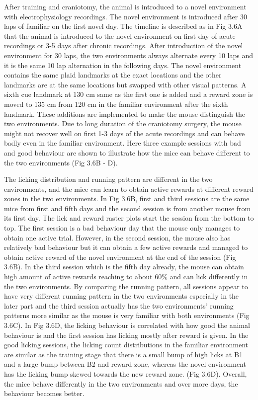 After training and craniotomy, the animal is introduced to a novel environment with electrophysiology recordings. The novel environment is introduced after 30 laps of familiar on the first novel day. The timeline is described as in Fig 3.6A that the animal is introduced to the novel environment on first day of acute recordings or 3-5 days after chronic recordings. After introduction of the novel environment for 30 laps, the two environments always alternate every 10 laps and it is the same 10 lap alternation in the following days. The novel environment contains the same plaid landmarks at the exact locations and the other landmarks are at the same locations but swapped with other visual patterns. A sixth cue landmark at 130 cm same as the first one is added and a reward zone is moved to 135 cm from 120 cm in the familiar environment after the sixth landmark. These additions are implemented to make the mouse distinguish the two environments. Due to long duration of the craniotomy surgery, the mouse might not recover well on first 1-3 days of the acute recordings and can behave badly even in the familiar environment. Here three example sessions with bad and good behaviour are shown to illustrate how the mice can behave different to the two environments (Fig 3.6B - D).

The licking distribution and running pattern are different in the two environments, and the mice can learn to obtain active rewards at different reward zones in the two environments. In Fig 3.6B, first and third sessions are the same mice from first and fifth days and the second session is from another mouse from its first day. The lick and reward raster plots start the session from the bottom to top. The first session is a bad behaviour day that the mouse only manages to obtain one active trial. However, in the second session, the mouse also has relatively bad behaviour but it can obtain a few active rewards and managed to obtain active reward of the novel environment at the end of the session (Fig 3.6B). In the third session which is the fifth day already, the mouse can obtain high amount of active rewards reaching to about 60\% and can lick differently in the two environments. By comparing the running pattern, all sessions appear to have very different running pattern in the two environments especially in the later part and the third session actually has the two environments' running patterns more similar as the mouse is very familiar with both environments (Fig 3.6C). In Fig 3.6D, the licking behaviour is correlated with how good the animal behaviour is and the first session has licking mostly after reward is given. In the good licking sessions, the licking count distributions in the familiar environment are similar as the training stage that there is a small bump of high licks at B1 and a large bump between B2 and reward zone, whereas the novel environment has the licking bump skewed towards the new reward zone. (Fig 3.6D). Overall, the mice behave differently in the two environments and over more days, the behaviour becomes better.



